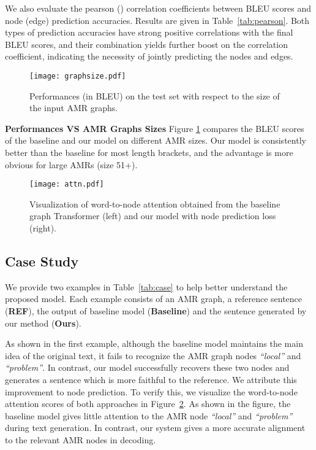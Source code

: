 \documentclass[11pt,a4paper]{article}
\begin{document}
We also evaluate the pearson () correlation coefficients between BLEU scores and node (edge) prediction accuracies.
Results are given in Table~\ref{tab:pearson}.
Both types of prediction accuracies have strong positive correlations with the final BLEU scores, and their 
combination yields further boost on the correlation coefficient, indicating the necessity of jointly predicting the nodes and edges.


\begin{figure}
	\centering
	\texttt{[image: graphsize.pdf]}
	\caption{Performances (in BLEU) on the test set with respect to the size of the input AMR graphs.}
	\label{fig:graphsize}
\end{figure}

\noindent\textbf{Performances VS AMR Graphs Sizes}
Figure \ref{fig:graphsize} compares the BLEU scores of the baseline and our model on different AMR sizes.
Our model is consistently better than the baseline for most length brackets, and the advantage is more obvious for large AMRs (size 51+).



\begin{figure}
	\centering
	\texttt{[image: attn.pdf]}
	\caption{Visualization of word-to-node attention obtained from the baseline graph Transformer (left) and our model with node prediction loss (right).}
	\label{fig:attn}
\end{figure}

\subsection{Case Study}
We provide two examples in Table~\ref{tab:case} to help better understand the proposed model. 
Each example consists of an AMR graph, a reference sentence (\textbf{REF}), the output of baseline model (\textbf{Baseline}) and the sentence generated by our method (\textbf{Ours}).

As shown in the first example, although the baseline model maintains the main idea of the original text, it fails to recognize the AMR graph nodes {\it ``local''} and {\it ``problem''}. 
In contrast, our model successfully recovers these two nodes and generates a sentence which is more faithful to the reference. 
We attribute this improvement to node prediction. 
To verify this, we visualize the word-to-node attention scores of both approaches in Figure~\ref{fig:attn}. 
As shown in the figure, the baseline model gives little attention to the AMR node \textit{``local''} and \textit{``problem''} during text generation.
In contrast, our system gives a more accurate alignment to the relevant AMR nodes in decoding.
\end{document}
